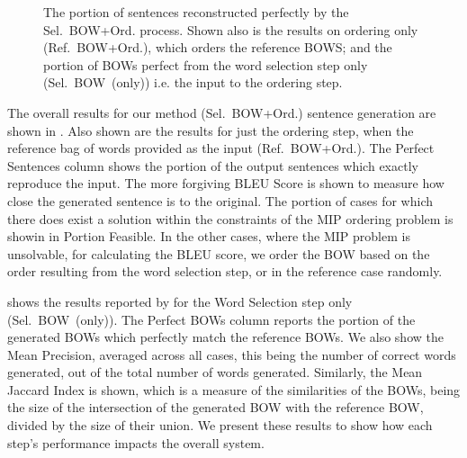 \documentclass[compsoc]{IEEEtran}
\theoremstyle{plain}
\theoremstyle{definition}
\newcommand{\oracletitle}{Ref.~BOW+Ord.}
\newcommand{\selectiontitle}{Sel.~BOW~(only)}
\newcommand{\twosteptitle}{Sel.~BOW+Ord.}
\begin{document}
\begin{figure}
	\centering
	 {\ordlenscoresoracle}
	\caption{The portion of sentences reconstructed perfectly by the \twosteptitle{} process. Shown also is the results on ordering only (\oracletitle{}), which orders the reference BOWS; and the portion of BOWs perfect from the word selection step only (\selectiontitle{}) i.e. the input to the ordering step.}
	\label{figure:exactlenscore}
\end{figure}


The overall results for our method (\twosteptitle{}) sentence generation are shown in . Also shown are the results for just the ordering step, when the reference bag of words provided as the input (\oracletitle{}). The Perfect Sentences column shows the portion of the output sentences which exactly reproduce the input. The more forgiving BLEU Score \cite{Papineni2002} is shown to measure how close the generated sentence is to the original. The portion of cases for which there does exist a solution within the constraints of the MIP ordering problem is showin in Portion Feasible. In the other cases, where the MIP problem is unsolvable, for calculating the BLEU score, we order the BOW based on the order resulting from the word selection step, or in the reference case randomly.

 shows the results reported by \cite{White2015BOWgen} for the Word Selection step only (\selectiontitle{}). The Perfect BOWs column reports the portion of the generated BOWs which perfectly match the reference BOWs. We also show the Mean Precision, averaged across all cases, this being the number of correct words generated, out of the total number of words generated. Similarly, the Mean Jaccard Index is shown, which is a measure of the similarities of the BOWs, being the size of the intersection of the generated BOW with the reference BOW, divided by the size of their union. We present these results to show how each step's performance impacts the overall system.
\end{document}

